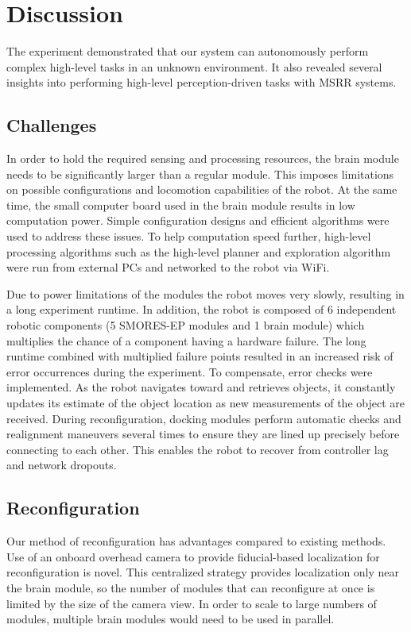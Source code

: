\documentclass[conference]{IEEEtran}
\begin{document}
\section{Discussion}
\label{sec:discussion}
%
The experiment demonstrated that our system can autonomously perform complex high-level tasks in an unknown environment. It also revealed several insights into performing high-level perception-driven tasks with MSRR systems.
\subsection{Challenges}

In order to hold the required sensing and processing resources, the brain module needs to be significantly larger than a regular module. This imposes limitations on possible configurations and locomotion capabilities of the robot. At the same time, the small computer board used in the brain module results in low computation power. Simple configuration designs and efficient algorithms were used to address these issues. To help computation speed further, high-level processing algorithms such as the high-level planner and exploration algorithm were run from external PCs and networked to the robot via WiFi.

Due to power limitations of the modules the robot moves very slowly, resulting in a long experiment runtime. In addition, the robot is composed of 6 independent robotic components (5 SMORES-EP modules and 1 brain module) which multiplies the chance of a component having a hardware failure. The long runtime combined with multiplied failure points resulted in an increased risk of error occurrences during the experiment. To compensate, error checks were implemented. As the robot navigates toward and retrieves objects, it constantly updates its estimate of the object location as new measurements of the object are received. During reconfiguration, docking modules perform automatic checks and realignment maneuvers several times to ensure they are lined up precisely before connecting to each other. This enables the robot to recover from controller lag and network dropouts.

%
\subsection{Reconfiguration}
Our method of reconfiguration has advantages compared to existing methods.  Use of an onboard overhead camera to provide fiducial-based localization for reconfiguration is novel.  This centralized strategy provides localization only near the brain module, so the number of modules that can reconfigure at once is limited by the size of the camera view. In order to scale to large numbers of modules, multiple brain modules would need to be used in parallel.
\end{document}
